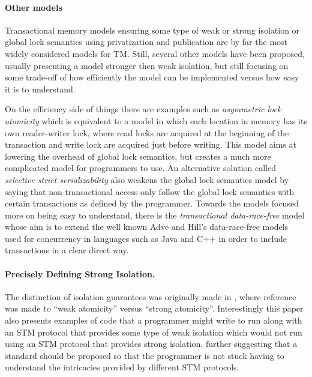 \paragraph{Other models}
Transactional memory models ensuring some type of weak or strong isolation or
global lock semantics using privatization and publication are by far the most
widely considered models for TM.
Still, several other models have been proposed, usually presenting a model
stronger then weak isolation, but still focusing on some
trade-off of how efficiently the model can be implemented versus how easy
it is to understand.

On the efficiency side of things there are examples such as \emph{asymmetric lock atomicity} \cite{MBS08}
which is equivalent to a model in which each location in memory has its own
reader-writer lock, where read locks are acquired at the beginning of the transaction
and write lock are acquired just before writing.
This model aims at lowering the overhead of global lock semantics, but creates a much more complicated
model for programmers to use.
An alternative solution called \emph{selective strict serializability} \cite{spear08} also weakens the global lock
semantics model by saying that non-transactional access only follow the global lock semantics
with certain transactions as defined by the programmer.
Towards the models focused more on being easy to understand, there is the \emph{transactional data-race-free}
model \cite{DS09} whose aim is to extend the well known Adve and Hill's data-race-free models \cite{AH93} used for concurrency in
languages such as Java and C++ in order to include transactions in a clear direct way.


\paragraph{Precisely Defining Strong Isolation.}

The  distinction  of isolation guarantees  was  originally  made  in
\cite{blundell06},  where   reference  was  made   to  {}``weak
atomicity'' versus {}``strong atomicity''.
Interestingly this paper also presents examples of code that a programmer
might write to run along with an STM protocol that provides some type of weak
isolation which would not run using an STM protocol that provides strong isolation,
further suggesting that a standard should be proposed so that the programmer
is not stuck having to understand the intricacies provided by different STM
protocols.

